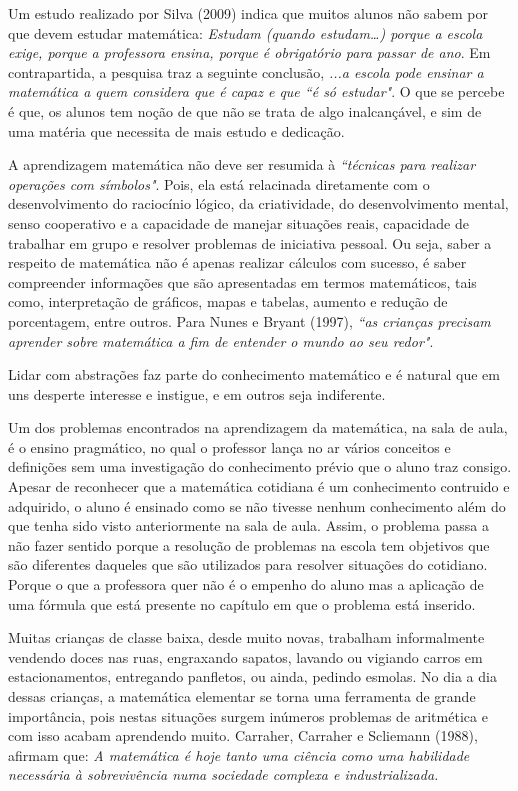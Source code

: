 \documentclass[brasil]{abnt}
\begin{document}
    Um estudo realizado por Silva (2009) indica que muitos alunos não sabem por que devem estudar matemática: \textit{Estudam (quando estudam…) porque a escola exige, porque 
    a professora ensina, porque é obrigatório para passar de ano}. Em contrapartida, a pesquisa traz a seguinte conclusão, \textit{...a escola pode ensinar a 
    matemática a quem considera que é capaz e que “é só estudar"}. O que se percebe é que, os alunos tem noção de que não se trata de algo inalcançável, 
    e sim de uma matéria que necessita de mais estudo e dedicação.
	
	A aprendizagem matemática não deve ser resumida à \textit{“técnicas para realizar operações com símbolos"}. Pois, ela está relacinada diretamente com o desenvolvimento do raciocínio lógico, da 
	criatividade, do desenvolvimento mental, senso cooperativo e a capacidade de manejar situações reais, capacidade de trabalhar em grupo e resolver problemas de iniciativa pessoal. 
	Ou seja, saber a respeito de matemática não é apenas realizar cálculos com sucesso, é saber compreender informações que são apresentadas em termos matemáticos, tais como, interpretação de gráficos, 
	mapas e tabelas, aumento e redução de porcentagem, entre outros. Para Nunes e Bryant (1997), \textit{“as crianças precisam aprender sobre matemática a fim de entender o mundo ao seu redor"}.
			
    Lidar com abstrações faz parte do conhecimento matemático e é natural que em uns desperte interesse e instigue, e em outros seja indiferente. 
    
    Um dos problemas encontrados na aprendizagem da matemática, na sala de aula, é o ensino pragmático, no qual o professor lança no ar vários conceitos e definições sem uma investigação 
    do conhecimento prévio que o aluno traz consigo. Apesar de reconhecer que a matemática cotidiana é um conhecimento contruido e adquirido, o aluno é ensinado como se não tivesse nenhum conhecimento 
    além do que tenha sido visto anteriormente na sala de aula. Assim, o problema passa a não fazer sentido porque a resolução de problemas na escola tem objetivos que são diferentes daqueles que são 
    utilizados para resolver situações do cotidiano. Porque o que a professora quer não é o empenho do aluno mas a aplicação de uma fórmula que está presente no capítulo em que o problema está inserido.
    
    Muitas crianças de classe baixa, desde muito novas, trabalham informalmente vendendo doces nas ruas, engraxando sapatos, lavando ou vigiando carros em estacionamentos, entregando 
    panfletos, ou ainda, pedindo esmolas. No dia a dia dessas crianças, a matemática elementar se torna uma ferramenta de grande importância, pois nestas situações surgem inúmeros problemas de aritmética  
    e com isso acabam aprendendo muito. Carraher, Carraher e Scliemann (1988), afirmam que: \textit{A matemática é hoje tanto uma ciência como uma habilidade necessária à sobrevivência numa sociedade 
    complexa e industrializada.}
    
\end{document}
